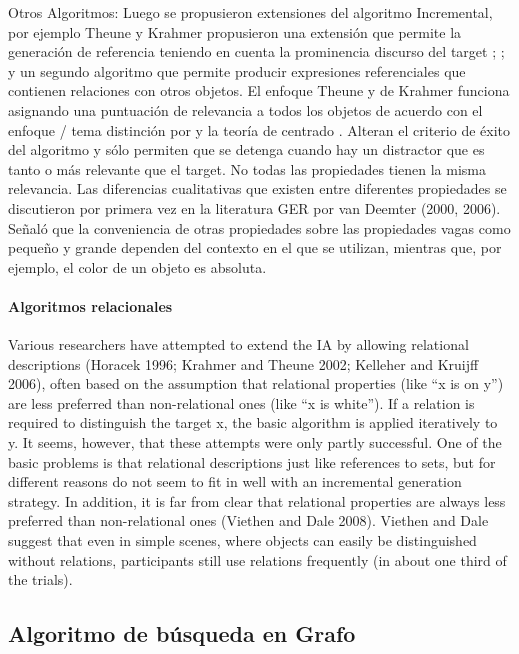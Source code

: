 Otros Algoritmos: Luego se propusieron extensiones del algoritmo Incremental, por ejemplo 
Theune y Krahmer propusieron una extensi\'on que permite la generaci\'on de referencia teniendo en cuenta la prominencia discurso del target \cite{Krahmer:2010:EMN:1880370}; \cite{krahmer-theune:2002a}; 
y un segundo algoritmo que permite producir expresiones referenciales que contienen relaciones con otros objetos. El enfoque Theune y de Krahmer funciona asignando una puntuaci\'on de relevancia a todos los objetos de acuerdo con el enfoque / tema distinci\'on por \cite{hajicova-1993} y la teor\'ia de centrado \cite{Grosz:1995:CFM:211190.211198}. Alteran el criterio de \'exito del algoritmo y s\'olo permiten que se detenga cuando hay un distractor que es tanto o m\'as relevante que el target.
No todas las propiedades tienen la misma relevancia. Las diferencias cualitativas que existen entre diferentes propiedades se discutieron por primera vez en la literatura GER por van Deemter (2000, 2006). Se\~nal\'o que la conveniencia de otras propiedades sobre las
propiedades vagas como peque\~no y grande dependen del contexto en el que se utilizan, mientras que, por ejemplo, el color de un objeto es absoluta. 

\paragraph{Algoritmos relacionales}

Various researchers have attempted to extend the IA by allowing relational descriptions
(Horacek 1996; Krahmer and Theune 2002; Kelleher and Kruijff 2006), often based
on the assumption that relational properties (like ``x is on y'') are less preferred than
non-relational ones (like ``x is white''). If a relation is required to distinguish the target
x, the basic algorithm is applied iteratively to y. It seems, however, that these attempts
were only partly successful. One of the basic problems is that relational descriptions
just like references to sets, but for different reasons do not seem to fit in well with an
incremental generation strategy. In addition, it is far from clear that relational properties
are always less preferred than non-relational ones (Viethen and Dale 2008). Viethen
and Dale suggest that even in simple scenes, where objects can easily be distinguished
without relations, participants still use relations frequently (in about one third of the
trials).


\subsection{Algoritmo de b\'usqueda en Grafo}
\label{graph}

